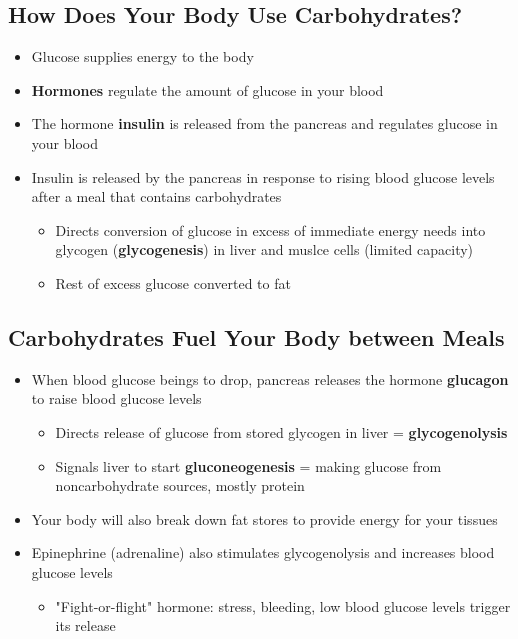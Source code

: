 \documentclass[12pt]{article}
\begin{document}
        \subsection{How Does Your Body Use Carbohydrates?}
            \begin{itemize}
                \item Glucose supplies energy to the body
                \item \textbf{Hormones} regulate the amount of glucose in your blood
                \item The hormone \textbf{insulin} is released from the pancreas and regulates glucose in your blood
                \item Insulin is released by the pancreas in response to rising blood glucose levels after a meal that contains carbohydrates
                    \begin{itemize}
                        \item Directs conversion of glucose in excess of immediate energy needs into glycogen (\textbf{glycogenesis}) in liver and muslce cells (limited capacity)
                        \item Rest of excess glucose converted to fat
                    \end{itemize}
            \end{itemize}

        \subsection{Carbohydrates Fuel Your Body between Meals}
            \begin{itemize}
                \item When blood glucose beings to drop, pancreas releases the hormone \textbf{glucagon} to raise blood glucose levels
                    \begin{itemize}
                        \item Directs release of glucose from stored glycogen in liver = \textbf{glycogenolysis}
                        \item Signals liver to start \textbf{gluconeogenesis} = making glucose from noncarbohydrate sources, mostly protein
                    \end{itemize}
                \item Your body will also break down fat stores to provide energy for your tissues
                \item Epinephrine (adrenaline) also stimulates glycogenolysis and increases blood glucose levels
                    \begin{itemize}
                        \item "Fight-or-flight" hormone: stress, bleeding, low blood glucose levels trigger its release
                    \end{itemize}
            \end{itemize}
\end{document}
